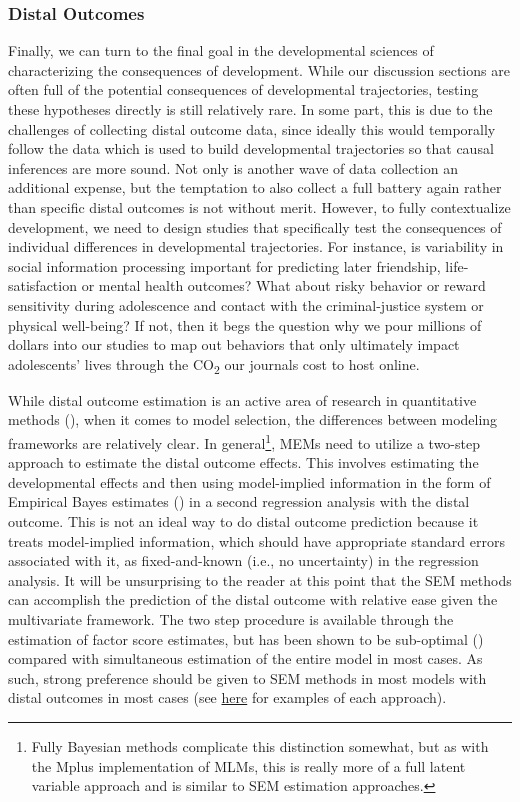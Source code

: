 \documentclass[11pt]{article}
\begin{document}
\subsubsection{Distal Outcomes}
Finally, we can turn to the final goal in the developmental sciences of characterizing the consequences of development. While our discussion sections are often full of the potential consequences of developmental trajectories, testing these hypotheses directly is still relatively rare. In some part, this is due to the challenges of collecting distal outcome data, since ideally this would temporally follow the data which is used to build developmental trajectories so that causal inferences are more sound. Not only is another wave of data collection an additional expense, but the temptation to also collect a full battery again rather than specific distal outcomes is not without merit. However, to fully contextualize development, we need to design studies that specifically test the consequences of individual differences in developmental trajectories. For instance, is variability in social information processing important for predicting later friendship, life-satisfaction or mental health outcomes? What about risky behavior or reward sensitivity during adolescence and contact with the criminal-justice system or physical well-being? If not, then it begs the question why we pour millions of dollars into our studies to map out behaviors that only ultimately impact adolescents' lives through the CO\textsubscript{2} our journals cost to host online. 

While distal outcome estimation is an active area of research in quantitative methods (\cite{smid_predicting_2020}), when it comes to model selection, the differences between modeling frameworks are relatively clear. In general\footnote{Fully Bayesian methods complicate this distinction somewhat, but as with the Mplus implementation of MLMs, this is really more of a full latent variable approach and is similar to SEM estimation approaches.}, MEMs need to utilize a two-step approach to estimate the distal outcome effects. This involves estimating the developmental effects and then using model-implied information in the form of Empirical Bayes estimates (\cite{liu_use_2021}) in a second regression analysis with the distal outcome. This is not an ideal way to do distal outcome prediction because it treats model-implied information, which should have appropriate standard errors associated with it, as fixed-and-known (i.e., no uncertainty) in the regression analysis. It will be unsurprising to the reader at this point that the SEM methods can accomplish the prediction of the distal outcome with relative ease given the multivariate framework. The two step procedure is available through the estimation of factor score estimates, but has been shown to be sub-optimal (\cite{skrondal_regression_2001}) compared with simultaneous estimation of the entire model in most cases. As such, strong preference should be given to SEM methods in most models with distal outcomes in most cases (see \href{https://e-m-mccormick.github.io/static/longitudinal-primer/05-covariates.html#distal-outcomes}{here} for examples of each approach).
\end{document}

